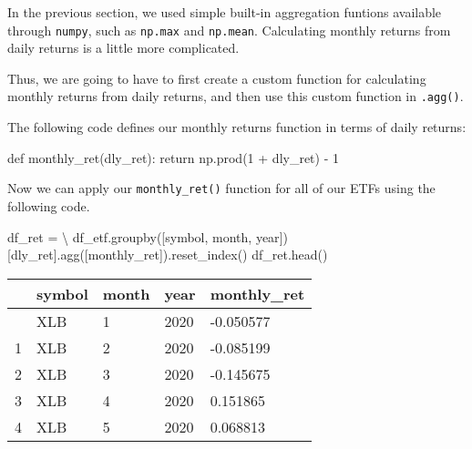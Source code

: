 \documentclass[
  letterpaper,
  DIV=11,
  numbers=noendperiod]{scrreprt}
\newenvironment{Shaded}{\begin{snugshade}}{\end{snugshade}}
\newcommand{\ControlFlowTok}[1]{\textcolor[rgb]{0.00,0.23,0.31}{#1}}
\newcommand{\DecValTok}[1]{\textcolor[rgb]{0.68,0.00,0.00}{#1}}
\newcommand{\KeywordTok}[1]{\textcolor[rgb]{0.00,0.23,0.31}{#1}}
\newcommand{\NormalTok}[1]{\textcolor[rgb]{0.00,0.23,0.31}{#1}}
\newcommand{\OperatorTok}[1]{\textcolor[rgb]{0.37,0.37,0.37}{#1}}
\newcommand{\StringTok}[1]{\textcolor[rgb]{0.13,0.47,0.30}{#1}}
\begin{document}
In the previous section, we used simple built-in aggregation funtions
available through \texttt{numpy}, such as \texttt{np.max} and
\texttt{np.mean}. Calculating monthly returns from daily returns is a
little more complicated.

Thus, we are going to have to first create a custom function for
calculating monthly returns from daily returns, and then use this custom
function in \texttt{.agg()}.

The following code defines our monthly returns function in terms of
daily returns:

\begin{Shaded}
\begin{Highlighting}[]
\KeywordTok{def}\NormalTok{ monthly\_ret(dly\_ret):}
    \ControlFlowTok{return}\NormalTok{ np.prod(}\DecValTok{1} \OperatorTok{+}\NormalTok{ dly\_ret) }\OperatorTok{{-}} \DecValTok{1}
\end{Highlighting}
\end{Shaded}

Now we can apply our \texttt{monthly\_ret()} function for all of our
ETFs using the following code.

\begin{Shaded}
\begin{Highlighting}[]
\NormalTok{df\_ret }\OperatorTok{=} \OperatorTok{\textbackslash{}}
\NormalTok{    df\_etf.groupby([}\StringTok{\textquotesingle{}symbol\textquotesingle{}}\NormalTok{, }\StringTok{\textquotesingle{}month\textquotesingle{}}\NormalTok{, }\StringTok{\textquotesingle{}year\textquotesingle{}}\NormalTok{])[}\StringTok{\textquotesingle{}dly\_ret\textquotesingle{}}\NormalTok{].agg([monthly\_ret]).reset\_index()}
\NormalTok{df\_ret.head()}
\end{Highlighting}
\end{Shaded}

\begin{longtable}[]{@{}lllll@{}}
\toprule\noalign{}
& symbol & month & year & monthly\_ret \\
\midrule\noalign{}
\endhead
\bottomrule\noalign{}
\endlastfoot
0 & XLB & 1 & 2020 & -0.050577 \\
1 & XLB & 2 & 2020 & -0.085199 \\
2 & XLB & 3 & 2020 & -0.145675 \\
3 & XLB & 4 & 2020 & 0.151865 \\
4 & XLB & 5 & 2020 & 0.068813 \\
\end{longtable}
\end{document}
